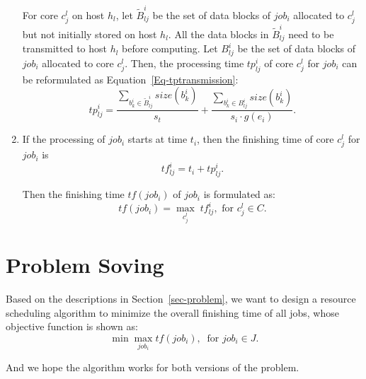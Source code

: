 \documentclass{llncs}
\begin{document}
\begin{enumerate}
		\qquad For core $c^l_j$ on host $h_l$, let $\widetilde{B}^i_{lj}$ be the set of data blocks of $job_i$ allocated to $c^l_j$ but not initially stored on host $h_l$. All the data blocks in $\widetilde{B}^i_{lj}$ need to be transmitted to host $h_l$ before computing. Let $B^i_{lj}$ be the set of data blocks of $job_i$ allocated to core $c^l_j$. Then, the processing time $tp^i_{lj}$ of core $c^l_j$ for $job_i$ can be reformulated as Equation~\eqref{Eq-tptransmission}:
		\begin{equation} \label{Eq-tptransmission}
			tp^i_{lj} = \frac{\sum_{b^i_{k} \in \widetilde{B}^i_{lj}} size(b^i_{k})}{s_t} + \frac{\sum_{b^i_{k} \in B^i_{lj}}size(b^i_{k})}{s_i \cdot g(e_i)}.
		\end{equation}
		
		\item If the processing of $job_i$ starts at time $t_i$, then the finishing time of core $c^l_j$ for $job_i$ is
		\begin{equation*}
			tf^i_{lj} = t_i + tp^i_{lj}.
		\end{equation*}
		
		Then the finishing time $tf(job_i)$ of $job_i$ is formulated as:
		\begin{equation*}
			tf(job_i) = \max_{c^l_j} \; tf^i_{lj}, \text{ for } c^l_j \in C.
		\end{equation*}
		
	\end{enumerate}
	
	
	\section{Problem Soving} \label{sec-solve}
	
	Based on the descriptions in Section~\ref{sec-problem}, we want to design a resource scheduling algorithm to minimize the overall finishing time of all jobs, whose objective function is shown as: 
	\begin{equation*}
		\min \max_{job_i} tf(job_i), \ \text{ for } job_i \in J. 
	\end{equation*}  
	
	And we hope the algorithm works for both versions of the problem.
	
\end{document}
